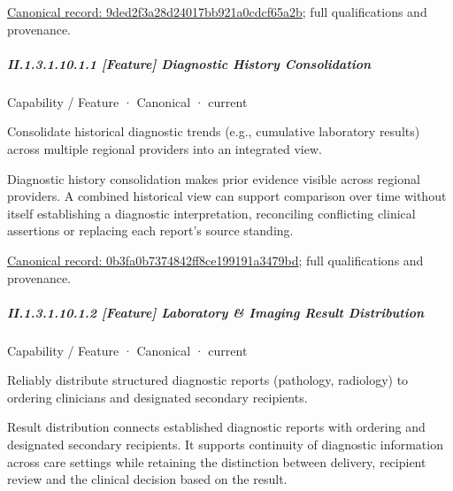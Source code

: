 {\footnotesize \href{../../../../continuum/strategy/capability/9ded2f3a28d24017bb921a0cdcf65a2b.md}{Canonical record: 9ded2f3a28d24017bb921a0cdcf65a2b}; full qualifications and provenance.}\par
\subparagraph*{II.1.3.1.10.1.1 [Feature] Diagnostic History Consolidation}
\label{navigation:II.1.3.1.10.1.1}

\label{element:0b3fa0b7374842ff8ce199191a3479bd}
{\small Capability / Feature · Canonical · current}\par

Consolidate historical diagnostic trends (e.g., cumulative laboratory results) across multiple regional providers into an integrated view.



Diagnostic history consolidation makes prior evidence visible across regional providers. A combined historical view can support comparison over time without itself establishing a diagnostic interpretation, reconciling conflicting clinical assertions or replacing each report's source standing.


{\footnotesize \href{../../../../continuum/strategy/capability/feature/0b3fa0b7374842ff8ce199191a3479bd.md}{Canonical record: 0b3fa0b7374842ff8ce199191a3479bd}; full qualifications and provenance.}\par
\subparagraph*{II.1.3.1.10.1.2 [Feature] Laboratory \& Imaging Result Distribution}
\label{navigation:II.1.3.1.10.1.2}

\label{element:93d42becda8f4850b73ff2c93bb7e8f3}
{\small Capability / Feature · Canonical · current}\par

Reliably distribute structured diagnostic reports (pathology, radiology) to ordering clinicians and designated secondary recipients.



Result distribution connects established diagnostic reports with ordering and designated secondary recipients. It supports continuity of diagnostic information across care settings while retaining the distinction between delivery, recipient review and the clinical decision based on the result.


